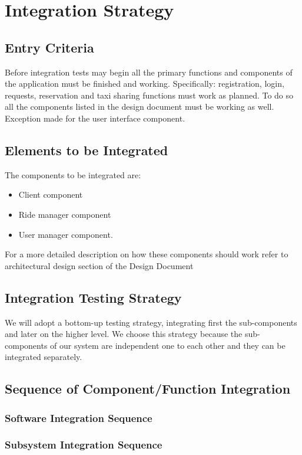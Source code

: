 \section{Integration Strategy}

\subsection{Entry Criteria}
Before integration tests may begin all the primary functions and components of the application must be finished and working.
Specifically: registration, login, requests, reservation and taxi sharing functions must work as planned. To do so all the components listed in the design document must be working as well. Exception made for the user interface component.

\subsection{Elements to be Integrated}
The components to be integrated are:
\begin{itemize}
	\item Client component
	\item Ride manager component
	\item User manager component. 
\end{itemize}
For a more detailed description on how these components should work refer to architectural design section of the Design Document

\subsection{Integration Testing Strategy}
We will adopt a bottom-up testing strategy, integrating first the sub-components and later on the higher level. 
We choose this strategy because the sub-components of our system are independent one to each other and they can be integrated separately.

\subsection{Sequence of Component/Function Integration}

\subsubsection{Software Integration Sequence}

\subsubsection{Subsystem Integration Sequence}

